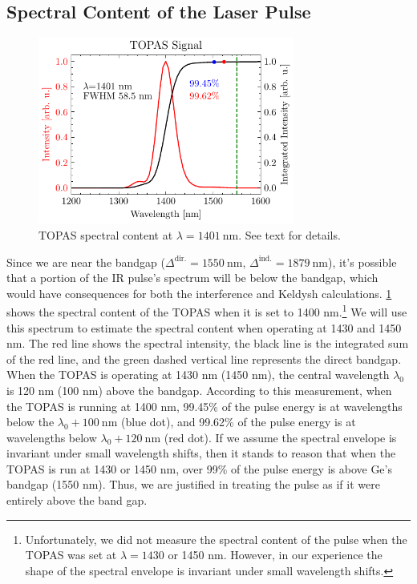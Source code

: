 \subsection{Spectral Content of the Laser Pulse}
\label{sec:bandwidth_of_pulse}

\begin{figure}
	\centering
	\includegraphics[width=0.75\textwidth]{figures/chap4/TOPAS_1400nm_spectral_inten.pdf}
	\caption{TOPAS spectral content at $\lambda = 1401 \ \textrm{nm}$. See text for details.}
	\label{fig:TOPAS_1400nm_spectral_inten}
\end{figure}

Since we are near the bandgap ($\Delta^{\textrm{dir.}} = 1550 \ \textrm{nm}$, $\Delta^{\textrm{ind.}} = 1879 \ \textrm{nm}$), it's possible that a portion of the IR pulse's spectrum will be below the bandgap, which would have consequences for both the interference and Keldysh calculations. \cref{fig:TOPAS_1400nm_spectral_inten} shows the spectral content of the TOPAS when it is set to 1400 nm.\footnote{Unfortunately, we did not measure the spectral content of the pulse when the TOPAS was set at $\lambda = 1430$ or 1450 nm. However, in our experience the shape of the spectral envelope is invariant under small wavelength shifts.} We will use this spectrum to estimate the spectral content when operating at 1430 and 1450 nm. The red line shows the spectral intensity, the black line is the integrated sum of the red line, and the green dashed vertical line represents the direct bandgap. When the TOPAS is operating at 1430 nm (1450 nm), the central wavelength $\lambda_0$ is 120 nm (100 nm) above the bandgap. According to this measurement, when the TOPAS is running at 1400 nm, 99.45\% of the pulse energy is at wavelengths below the $\lambda_0 + 100 \ \textrm{nm}$ (blue dot), and 99.62\% of the pulse energy is at wavelengths below $\lambda_0 + 120 \ \textrm{nm}$ (red dot). If we assume the spectral envelope is invariant under small wavelength shifts, then it stands to reason that when the TOPAS is run at 1430 or 1450 nm, over 99\% of the pulse energy is above Ge's bandgap (1550 nm). Thus, we are justified in treating the pulse as if it were entirely above the band gap.


